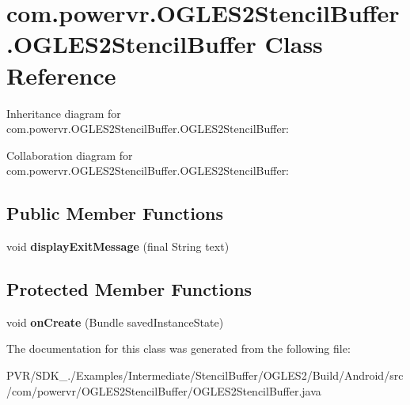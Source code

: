 \hypertarget{classcom_1_1powervr_1_1_o_g_l_e_s2_stencil_buffer_1_1_o_g_l_e_s2_stencil_buffer}{\section{com.\+powervr.\+O\+G\+L\+E\+S2\+Stencil\+Buffer.\+O\+G\+L\+E\+S2\+Stencil\+Buffer Class Reference}
\label{classcom_1_1powervr_1_1_o_g_l_e_s2_stencil_buffer_1_1_o_g_l_e_s2_stencil_buffer}
}


Inheritance diagram for com.\+powervr.\+O\+G\+L\+E\+S2\+Stencil\+Buffer.\+O\+G\+L\+E\+S2\+Stencil\+Buffer\+:


Collaboration diagram for com.\+powervr.\+O\+G\+L\+E\+S2\+Stencil\+Buffer.\+O\+G\+L\+E\+S2\+Stencil\+Buffer\+:
\subsection*{Public Member Functions}
\begin{DoxyCompactItemize}
\item 
\hypertarget{classcom_1_1powervr_1_1_o_g_l_e_s2_stencil_buffer_1_1_o_g_l_e_s2_stencil_buffer_ad26f5e70b04afbbadcd80d384d37ba3e}{void {\bfseries display\+Exit\+Message} (final String text)}\label{classcom_1_1powervr_1_1_o_g_l_e_s2_stencil_buffer_1_1_o_g_l_e_s2_stencil_buffer_ad26f5e70b04afbbadcd80d384d37ba3e}

\end{DoxyCompactItemize}
\subsection*{Protected Member Functions}
\begin{DoxyCompactItemize}
\item 
\hypertarget{classcom_1_1powervr_1_1_o_g_l_e_s2_stencil_buffer_1_1_o_g_l_e_s2_stencil_buffer_a930bc868f230502f99335d0124990614}{void {\bfseries on\+Create} (Bundle saved\+Instance\+State)}\label{classcom_1_1powervr_1_1_o_g_l_e_s2_stencil_buffer_1_1_o_g_l_e_s2_stencil_buffer_a930bc868f230502f99335d0124990614}

\end{DoxyCompactItemize}


The documentation for this class was generated from the following file\+:\begin{DoxyCompactItemize}
\item 
P\+V\+R/\+S\+D\+K\+\_./\+Examples/\+Intermediate/\+Stencil\+Buffer/\+O\+G\+L\+E\+S2/\+Build/\+Android/src/com/powervr/\+O\+G\+L\+E\+S2\+Stencil\+Buffer/O\+G\+L\+E\+S2\+Stencil\+Buffer.\+java\end{DoxyCompactItemize}
